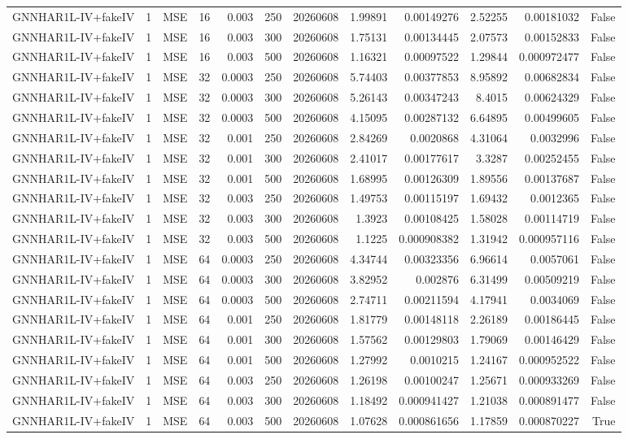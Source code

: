 \begin{tabular}{lrlrrrrrrrrr}
GNNHAR1L-IV+fakeIV & 1 & MSE & 16 & 0.003 & 250 & 20260608 & 1.99891 & 0.00149276 & 2.52255 & 0.00181032 & False \\
GNNHAR1L-IV+fakeIV & 1 & MSE & 16 & 0.003 & 300 & 20260608 & 1.75131 & 0.00134445 & 2.07573 & 0.00152833 & False \\
GNNHAR1L-IV+fakeIV & 1 & MSE & 16 & 0.003 & 500 & 20260608 & 1.16321 & 0.00097522 & 1.29844 & 0.000972477 & False \\
GNNHAR1L-IV+fakeIV & 1 & MSE & 32 & 0.0003 & 250 & 20260608 & 5.74403 & 0.00377853 & 8.95892 & 0.00682834 & False \\
GNNHAR1L-IV+fakeIV & 1 & MSE & 32 & 0.0003 & 300 & 20260608 & 5.26143 & 0.00347243 & 8.4015 & 0.00624329 & False \\
GNNHAR1L-IV+fakeIV & 1 & MSE & 32 & 0.0003 & 500 & 20260608 & 4.15095 & 0.00287132 & 6.64895 & 0.00499605 & False \\
GNNHAR1L-IV+fakeIV & 1 & MSE & 32 & 0.001 & 250 & 20260608 & 2.84269 & 0.0020868 & 4.31064 & 0.0032996 & False \\
GNNHAR1L-IV+fakeIV & 1 & MSE & 32 & 0.001 & 300 & 20260608 & 2.41017 & 0.00177617 & 3.3287 & 0.00252455 & False \\
GNNHAR1L-IV+fakeIV & 1 & MSE & 32 & 0.001 & 500 & 20260608 & 1.68995 & 0.00126309 & 1.89556 & 0.00137687 & False \\
GNNHAR1L-IV+fakeIV & 1 & MSE & 32 & 0.003 & 250 & 20260608 & 1.49753 & 0.00115197 & 1.69432 & 0.0012365 & False \\
GNNHAR1L-IV+fakeIV & 1 & MSE & 32 & 0.003 & 300 & 20260608 & 1.3923 & 0.00108425 & 1.58028 & 0.00114719 & False \\
GNNHAR1L-IV+fakeIV & 1 & MSE & 32 & 0.003 & 500 & 20260608 & 1.1225 & 0.000908382 & 1.31942 & 0.000957116 & False \\
GNNHAR1L-IV+fakeIV & 1 & MSE & 64 & 0.0003 & 250 & 20260608 & 4.34744 & 0.00323356 & 6.96614 & 0.0057061 & False \\
GNNHAR1L-IV+fakeIV & 1 & MSE & 64 & 0.0003 & 300 & 20260608 & 3.82952 & 0.002876 & 6.31499 & 0.00509219 & False \\
GNNHAR1L-IV+fakeIV & 1 & MSE & 64 & 0.0003 & 500 & 20260608 & 2.74711 & 0.00211594 & 4.17941 & 0.0034069 & False \\
GNNHAR1L-IV+fakeIV & 1 & MSE & 64 & 0.001 & 250 & 20260608 & 1.81779 & 0.00148118 & 2.26189 & 0.00186445 & False \\
GNNHAR1L-IV+fakeIV & 1 & MSE & 64 & 0.001 & 300 & 20260608 & 1.57562 & 0.00129803 & 1.79069 & 0.00146429 & False \\
GNNHAR1L-IV+fakeIV & 1 & MSE & 64 & 0.001 & 500 & 20260608 & 1.27992 & 0.0010215 & 1.24167 & 0.000952522 & False \\
GNNHAR1L-IV+fakeIV & 1 & MSE & 64 & 0.003 & 250 & 20260608 & 1.26198 & 0.00100247 & 1.25671 & 0.000933269 & False \\
GNNHAR1L-IV+fakeIV & 1 & MSE & 64 & 0.003 & 300 & 20260608 & 1.18492 & 0.000941427 & 1.21038 & 0.000891477 & False \\
GNNHAR1L-IV+fakeIV & 1 & MSE & 64 & 0.003 & 500 & 20260608 & 1.07628 & 0.000861656 & 1.17859 & 0.000870227 & True \\
\bottomrule
\end{tabular}
